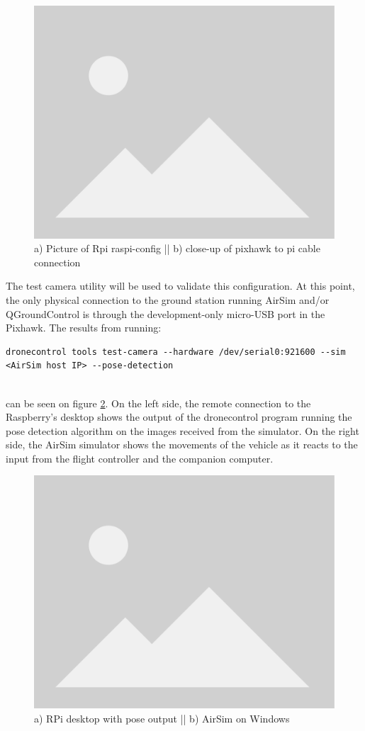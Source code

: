 \begin{figure}
  \centering
  \includegraphics[width=.6\textwidth, keepaspectratio]{img/placeholder.png}
  \caption{a) Picture of Rpi raspi-config || b) close-up of pixhawk to pi cable connection}\label{fig:serial-connection}
\end{figure}

The test camera utility will be used to validate this configuration.
At this point, the only physical connection to the ground station running AirSim and/or QGroundControl is through the development-only micro-USB port in the Pixhawk.
The results from running: \\
\begin{listing}[h!]
    \begin{verbatim}
dronecontrol tools test-camera --hardware /dev/serial0:921600 --sim <AirSim host IP> --pose-detection
    \end{verbatim}
\end{listing}\\
can be seen on figure \ref{fig:rpi-airsim-test}.
On the left side, the remote connection to the Raspberry's desktop shows the output of the dronecontrol program running the pose detection algorithm on the images received from the simulator.
On the right side, the AirSim simulator shows the movements of the vehicle as it reacts to the input from the flight controller and the companion computer.

\begin{figure}
  \centering
  \includegraphics[width=.8\textwidth, keepaspectratio]{img/placeholder.png}
  \caption{a) RPi desktop with pose output || b) AirSim on Windows}\label{fig:rpi-airsim-test}
\end{figure}


